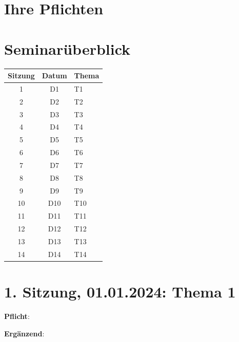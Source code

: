 \documentclass[
  12pt,
]{article}
\begin{document}
\lipsum[3]

\section{Ihre Pflichten}\label{ihre-pflichten}

\lipsum[4-5]

\section{Seminarüberblick}\label{seminaruxfcberblick}

\begin{table}
\centering
\begin{tabular}{ccl}
\toprule
\textbf{Sitzung} & \textbf{Datum} & \textbf{Thema}\\
\midrule
1 & D1 & T1\\
2 & D2 & T2\\
3 & D3 & T3\\
4 & D4 & T4\\
5 & D5 & T5\\
6 & D6 & T6\\
7 & D7 & T7\\
8 & D8 & T8\\
9 & D9 & T9\\
10 & D10 & T10\\
11 & D11 & T11\\
12 & D12 & T12\\
13 & D13 & T13\\
14 & D14 & T14\\
\bottomrule
\end{tabular}
\end{table}

\section{\texorpdfstring{\textcolor{gublue}{1. Sitzung, 01.01.2024: Thema 1}}{}}\label{section}

 \textbf{Pflicht}:

 \textbf{Ergänzend}:

\lipsum[6-7]

\label{3ade8a4a-fb1d-4a6c-8409-ac45482d5fc9}
\end{document}
